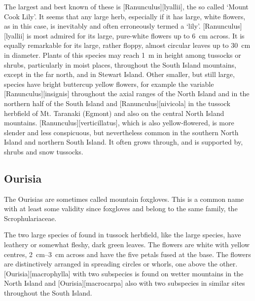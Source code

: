The largest and best known of these is [Ranunculus][lyallii], the so called `Mount Cook Lily'.
It seems that any large herb, especially if it has large, white flowers, as in this case, is inevitably and often erroneously termed a `lily'. [Ranunculus][lyallii] is most admired for its large, pure-white flowers up to \SI{6}{\centi\metre} across.
It is equally remarkable for its large, rather floppy, almost circular leaves up to \SI{30}{\centi\metre} in diameter.
Plants of this species may reach \SI{1}{\metre} in height among tussocks or shrubs, particularly in moist places, throughout the South Island mountains, except in the far north, and in Stewart Island.
Other smaller, but still large, species have bright buttercup yellow flowers, for example the variable [Ranunculus][insignis] throughout the axial ranges of the North Island and in the northern half of the South Island and [Ranunculus][nivicola] in the tussock herbfield of Mt.
Taranaki (Egmont) and also on the central North Island mountains. [Ranunculus][verticillatus], which is also yellow-flowered, is more slender and less conspicuous, but nevertheless common in the southern North Island and northern South Island.
It often grows through, and is supported by, shrubs and snow tussocks.

\subsection{Ourisia}

The Ourisias are sometimes called mountain foxgloves.
This is a common name with at least some validity since foxgloves and  belong to the same family, the Scrophulariaceae.

The two large species of  found in tussock herbfield, like the large  species, have leathery or somewhat fleshy, dark green leaves.
The flowers are white with yellow centres, \SIrange{2}{3}{\centi\metre} across and have the five petals fused at the base.
The flowers are distinctively arranged in spreading circles or whorls, one above the other. [Ourisia][macrophylla] with two subspecies is found on wetter mountains in the North Island and [Ourisia][macrocarpa] also with two subspecies in similar sites throughout the South Island.

